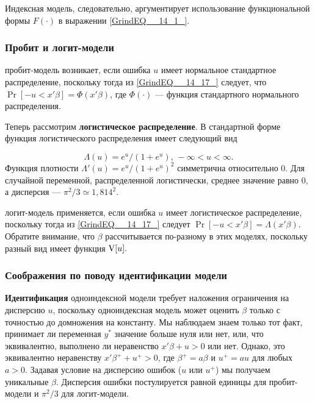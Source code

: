 Индексная модель,  следовательно,  аргументирует использование функциональной формы $F(\cdot)$ в выражении \eqref{GrindEQ__14_1_}.

\subsubsection*{Пробит и логит-модели}

пробит-модель возникает,  если ошибка $u$ имеет нормальное стандартное распределение,  поскольку тогда из \eqref{GrindEQ__14_17_} следует, что  $\Pr[-u < x'\beta] = \Phi(x'\beta)$, где $\Phi(\cdot)$ --- функция стандартного нормального распределения.

Теперь рассмотрим \textbf{логистическое распределение}. В стандартной форме функция логистического распределения имеет следующий вид 

\begin{equation} 
\label{GrindEQ__14_18_} 
\Lambda(u) = e^u /(1+e^u), \, -\infty < u < \infty. 
\end{equation} 
Функция плотности $\Lambda'(u) = e^u/(1 + e^u)^2$ симметрична относительно 0. Для случайной переменной,  распределенной логистически,  среднее значение  равно 0,  а дисперсия --- $\pi^2/3\simeq {1,814}^2$.

логит-модель применяется,  если ошибка $u$ имеет логистическое распределение,  поскольку тогда из \eqref{GrindEQ__14_17_} следует $\Pr[-u < x'\beta] = \Lambda (x'\beta)$. Обратите внимание,  что $\beta$ рассчитывается по-разному в этих моделях,  поскольку разный вид имеет функция $\mathrm{V}[u].$ 

\subsubsection*{Соображения по поводу идентификации модели}

\textbf{Идентификация} одноиндексной модели требует наложения ограничения на дисперсию $u$, поскольку одноиндексная модель может оценить $\beta$ только с точностью до домножения на константу. Мы наблюдаем знаем только тот факт, принимает ли переменная $y^*$ значение больше нуля или нет,  или,  что эквивалентно,  выполнено ли неравенство $x'\beta +u>0$ или нет. Однако,  это эквивалентно неравенству $x'\beta^++u^+>0$, где $\beta^+=a\beta $ и $u^+=au$ для любых $a>0.$ Задавая условие на  дисперсию ошибок ($u$ или $u^+$) мы получаем уникальные  $\beta$. Дисперсия ошибки постулируется равной единицы для пробит-модели и $\pi^2/3$ для логит-модели.

